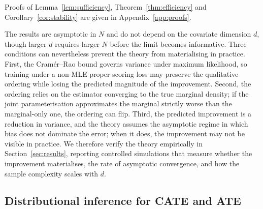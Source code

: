 \documentclass[11pt]{article}
\begin{document}
Proofs of Lemma~\ref{lem:sufficiency}, Theorem~\ref{thm:efficiency} and
Corollary~\ref{cor:stability} are given in Appendix~\ref{app:proofs}. 

The results are asymptotic in $N$ and do not depend on the covariate dimension
$d$, though larger $d$ requires larger $N$ before the limit becomes
informative. Three conditions can nevertheless prevent the theory from
materialising in practice. First, the Cram\'er--Rao bound governs variance
under maximum likelihood, so training under a non-MLE proper-scoring loss may
preserve the qualitative ordering while losing the predicted magnitude of the
improvement. Second, the ordering relies on the estimator converging to the
true marginal density; if the joint parameterisation approximates the marginal strictly worse than the marginal-only one, the ordering can flip.
Third, the predicted improvement is a reduction in variance, and the theory
assumes the asymptotic regime in which bias does not dominate the error; when
it does, the improvement may not be visible in practice. We therefore verify the theory empirically in Section~\ref{sec:results},
reporting controlled simulations that measure whether the improvement
materialises, the rate of asymptotic convergence, and how the sample complexity
scales with $d$.

\subsection{Distributional inference for CATE and ATE}
\label{sec:info-gain}
\end{document}
